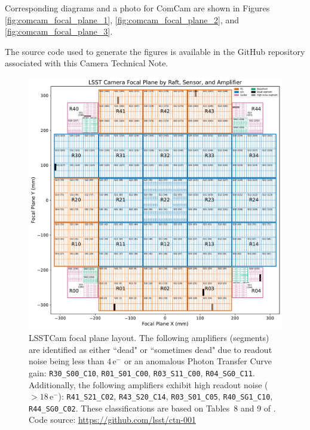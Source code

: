 \documentclass[CTN,authoryear,toc]{lsstdoc}
\begin{document}
Corresponding diagrams and a photo for ComCam are shown in Figures \ref{fig:comcam_focal_plane_1}, \ref{fig:comcam_focal_plane_2}, and \ref{fig:comcam_focal_plane_3}. 

The source code used to generate the figures is available in the GitHub repository associated with this Camera Technical Note.

\clearpage

\begin{figure}
  \centering
  \includegraphics[width=\textwidth]{figures/LSSTCam_focal_plane_CTN_001_FIG1.pdf}
  \caption{LSSTCam focal plane layout. The following amplifiers (segments) are identified as either ``dead" or ``sometimes dead" due to readout noise being less than $4\,\mathrm{e}^{-}$ or an anomalous Photon Transfer Curve gain: {\tt{R30\_S00\_C10}}, {\tt{R01\_S01\_C00}}, {\tt{R03\_S11\_C00}}, {\tt{R04\_SG0\_C11}}. Additionally, the following amplifiers exhibit high readout noise ($> 18\,\mathrm{e}^{-}$): {\tt{R41\_S21\_C02}}, {\tt{R43\_S20\_C14}}, {\tt{R03\_S01\_C05}}, {\tt{R40\_SG1\_C10}}, {\tt{R44\_SG0\_C02}}. These classifications are based on Tables~8 and 9 of . Code source: \url{https://github.com/lsst/ctn-001}}
  \label{fig:focal_plane_1}
\end{figure}

\clearpage
\end{document}
